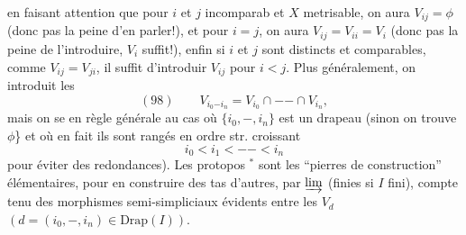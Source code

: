 
en faisant attention que pour $i$ et $j$ incomparab et $X$ metrisable, on  aura $V_{ij}=\phi$  (donc pas la peine d'en parler!), et pour $i=j$, on aura $V_{ij}=V_{ii}=V_i$ (donc pas la peine de l'introduire, $V_i$ suffit!), enfin  si $i$ et $j$ sont distincts et comparables,  comme $V_{ij}=V_{ji}$, il suffit d'introduir $V_{ij}$ pour  $i<j$. Plus généralement, on introduit les
\[(98)\qquad V_{i_0\mathord{-}i_n}=V_{i_0}\cap\mathord{-}\mathord{-}\cap V_{i_n},\]
mais on se  en règle générale au cas où $\{i_0,\mathord{-},i_n\}$ est un drapeau (sinon on trouve $\phi$\} et où en fait ils sont rangés en ordre str. croissant
\[i_0<i_1<\mathord{-}\mathord{-}<i_n\]
\unsure{(}pour éviter des redondances). Les protopos $^*$ sont les ``pierres de construction'' élémentaires, pour en construire des tas d'autres, par $\varinjlim$ (finies si $I$ fini), compte tenu des morphismes semi-simpliciaux évidents entre les $V_d$ $(d=(i_0,\mathord{-},i_n)\in\mathrm{Drap}(I))$.
